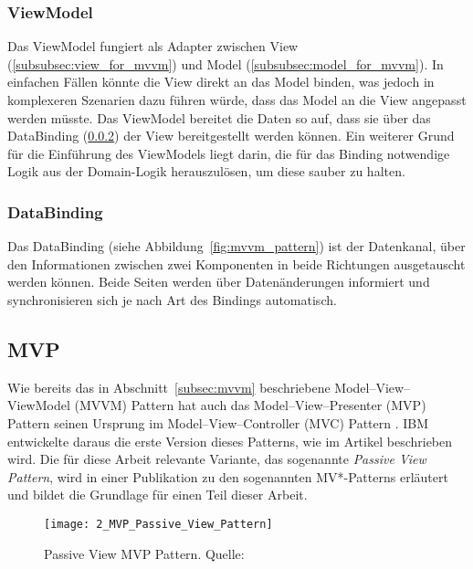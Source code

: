 \subsubsection{ViewModel}
\label{subsubsec:viewmodel}
Das ViewModel fungiert als Adapter zwischen View (\ref{subsubsec:view_for_mvvm}) und Model (\ref{subsubsec:model_for_mvvm}). 
In einfachen Fällen könnte die View direkt an das Model binden, was jedoch in komplexeren Szenarien dazu führen würde, dass das Model an die View angepasst werden müsste. Das ViewModel bereitet die Daten so auf, dass sie über das DataBinding (\ref{subsubsec:databinding}) der View bereitgestellt werden können. 
Ein weiterer Grund für die Einführung des ViewModels liegt darin, die für das Binding notwendige Logik aus der Domain-Logik herauszulösen, um diese sauber zu halten.

\newpage

\subsubsection{DataBinding}
\label{subsubsec:databinding}
Das DataBinding (siehe Abbildung~\ref{fig:mvvm_pattern}) ist der Datenkanal, über den Informationen zwischen zwei Komponenten in beide Richtungen ausgetauscht werden können. 
Beide Seiten werden über Datenänderungen informiert und synchronisieren sich je nach Art des Bindings automatisch.

\subsection{MVP}
\label{subsec:mvp}
Wie bereits das in Abschnitt~\ref{subsec:mvvm} beschriebene Model–View–ViewModel (MVVM) Pattern hat auch das Model–View–Presenter (MVP) Pattern seinen Ursprung im Model–View–Controller (MVC) Pattern \cite{Krasner1988MVC}. 
IBM entwickelte daraus die erste Version dieses Patterns, wie im Artikel \cite{potel1996mvp} beschrieben wird. 
Die für diese Arbeit relevante Variante, das sogenannte \textit{Passive View Pattern}, wird in einer Publikation zu den sogenannten MV*-Patterns \cite{mvp_ieee} erläutert und bildet die Grundlage für einen Teil dieser Arbeit.

\begin{figure}[H]
    \centering
    \texttt{[image: 2\_MVP\_Passive\_View\_Pattern]}
    \caption{Passive View MVP Pattern. Quelle: \cite{mvp_ieee}}
    \label{fig:mvp_pattern}
\end{figure}

